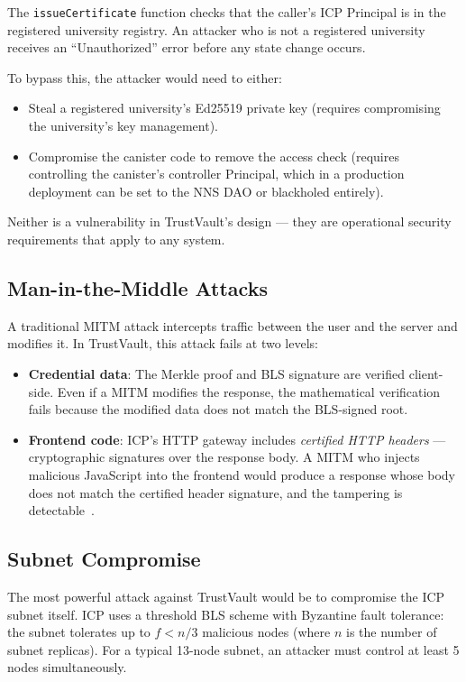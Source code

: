 \documentclass[conference]{IEEEtran}
\begin{document}
The \texttt{issueCertificate} function checks that the caller's ICP Principal is in the registered university registry. An attacker who is not a registered university receives an ``Unauthorized'' error before any state change occurs.

To bypass this, the attacker would need to either:
\begin{itemize}[leftmargin=*]
  \item Steal a registered university's Ed25519 private key (requires compromising the university's key management).
  \item Compromise the canister code to remove the access check (requires controlling the canister's controller Principal, which in a production deployment can be set to the NNS DAO or blackholed entirely).
\end{itemize}

Neither is a vulnerability in TrustVault's design — they are operational security requirements that apply to any system.

\subsection{Man-in-the-Middle Attacks}

A traditional MITM attack intercepts traffic between the user and the server and modifies it. In TrustVault, this attack fails at two levels:

\begin{itemize}[leftmargin=*]
  \item \textbf{Credential data}: The Merkle proof and BLS signature are verified client-side. Even if a MITM modifies the response, the mathematical verification fails because the modified data does not match the BLS-signed root.
  \item \textbf{Frontend code}: ICP's HTTP gateway includes \emph{certified HTTP headers} — cryptographic signatures over the response body. A MITM who injects malicious JavaScript into the frontend would produce a response whose body does not match the certified header signature, and the tampering is detectable~\cite{dfinity2023httpgateway}.
\end{itemize}

\subsection{Subnet Compromise}

The most powerful attack against TrustVault would be to compromise the ICP subnet itself. ICP uses a threshold BLS scheme with Byzantine fault tolerance: the subnet tolerates up to $f < n/3$ malicious nodes (where $n$ is the number of subnet replicas). For a typical 13-node subnet, an attacker must control at least 5 nodes simultaneously.
\end{document}
